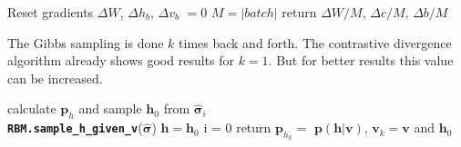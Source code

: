 \documentclass[a4paper]{article}
\begin{document}
\begin{algorithm}[H]
	 \caption{Compute Gradient from Batch. \textbf{\lstinline{RBM.compute_batch_gradients}}(k, batch) }
  \SetAlgoLined
  Reset gradients $\Delta W$, $\Delta h_b$, $\Delta v_b$ $= 0$\;
 $M = \vert batch \vert$ \;
 return $\Delta W / M$,  $\Delta c / M$, $\Delta b / M$
\end{algorithm}


The Gibbs sampling is done $k$ times back and forth. The contrastive divergence algorithm already shows good results for $k=1$. But for better results this value can be increased.

\begin{algorithm}[H]
	 \caption{Gibbs sampling. \textbf{\lstinline{RBM.gibbs_sampling}}(k, $\hat{ \boldsymbol{ \sigma}}_i$) }
  \SetAlgoLined
  calculate $\bm{p}_h$ and sample $\bm{h}_0$ from $\hat{ \boldsymbol{ \sigma}}_i$\\
  \textbf{\lstinline{RBM.sample_h_given_v}}($\hat{ \boldsymbol{ \sigma}}$)   
  $\bm{h} = \bm{h}_0$\;
  i = 0\;
  return $\bm{p}_{h_k} =$  $\bm{p}(\bm{h}|\bm{v})$, $\bm{v}_k = \bm{v}$ and $\bm{h}_0$\;
 
\end{algorithm}


\end{document}
